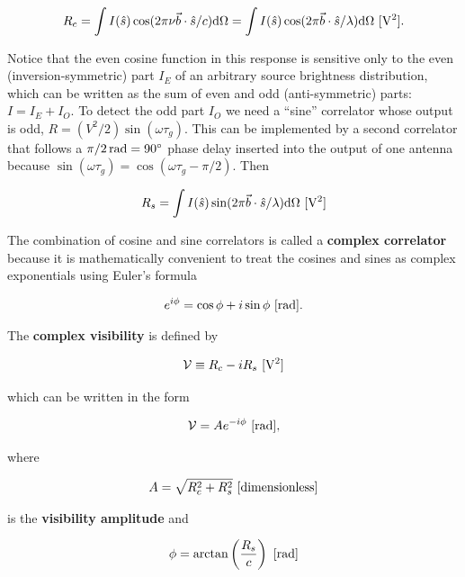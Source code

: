 \documentclass[a4paper,10pt]{article}
\begin{document}
\begin{align*}
    R_c = \int I(\hat{s})\cos(2\pi\nu\vec{b}\cdot\hat{s}/c){\rm d}\Omega = \int I(\hat{s})\cos(2\pi\vec{b}\cdot\hat{s}/\lambda){\rm d}\Omega ~ [{\rm V^2}].
\end{align*}

{\noindent}Notice that the even cosine function in this response is sensitive only to the even (inversion-symmetric) part $I_E$ of an arbitrary source brightness distribution, which can be written as the sum of even and odd (anti-symmetric) parts: $I=I_E+I_O$. To detect the odd part $I_O$ we need a ``sine'' correlator whose output is odd, $R=(V^2/2)\sin(\omega\tau_g)$. This can be implemented by a second correlator that follows a $\pi/2\,{\rm rad}=90^\circ$ phase delay inserted into the output of one antenna because $\sin(\omega\tau_g)=\cos(\omega\tau_g-\pi/2)$. Then

\begin{align*}
    R_s = \int I(\hat{s})\sin(2\pi\vec{b}\cdot\hat{s}/\lambda){\rm d}\Omega ~ [{\rm V^2}]
\end{align*}

{\noindent}The combination of cosine and sine correlators is called a \textbf{complex correlator} because it is mathematically convenient to treat the cosines and sines as complex exponentials using Euler's formula

\begin{align*}
    e^{i\phi} = \cos\phi + i\sin\phi ~ [{\rm rad}].
\end{align*}

{\noindent}The \textbf{complex visibility} is defined by

\begin{align*}
    \mathcal{V} \equiv R_c - i R_s ~ [{\rm V^2}]
\end{align*}

{\noindent}which can be written in the form

\begin{align*}
    \mathcal{V} = Ae^{-i\phi} ~ [{\rm rad}],
\end{align*}

{\noindent}where 

\begin{align*}
    A = \sqrt{R_c^2 + R_s^2} ~ [{\rm dimensionless}]
\end{align*}

{\noindent}is the \textbf{visibility amplitude} and

\begin{align*}
    \phi = \arctan \left(\frac{R_s}{c}\right) ~ [{\rm rad}]
\end{align*}
\end{document}
